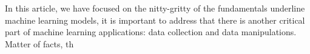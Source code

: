 In this article, we have focused on the nitty-gritty of the fundamentals underline machine learning models, it is important to address that there is another critical part of machine learning applications: data collection and data manipulations. Matter of facts, th 